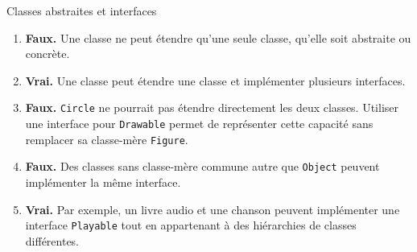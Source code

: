 \begin{Exercice}[5 minutes]{Classes abstraites et interfaces}
\begin{solution}
\begin{enumerate}
    \item \textbf{Faux.} Une classe ne peut étendre qu'une seule classe, qu'elle soit abstraite ou concrète.
    \item \textbf{Vrai.} Une classe peut étendre une classe et implémenter plusieurs interfaces. 
    \item \textbf{Faux.} \lstinline{Circle} ne pourrait pas étendre directement les deux classes. Utiliser une interface pour \lstinline{Drawable} permet de représenter cette capacité sans remplacer sa classe-mère \lstinline{Figure}.
    \item \textbf{Faux.} Des classes sans classe-mère commune autre que \lstinline{Object} peuvent implémenter la même interface.
    \item \textbf{Vrai.} Par exemple, un livre audio et une chanson peuvent implémenter une interface \lstinline{Playable} tout en appartenant à des hiérarchies de classes différentes.
\end{enumerate}
\end{solution}
\end{Exercice}


